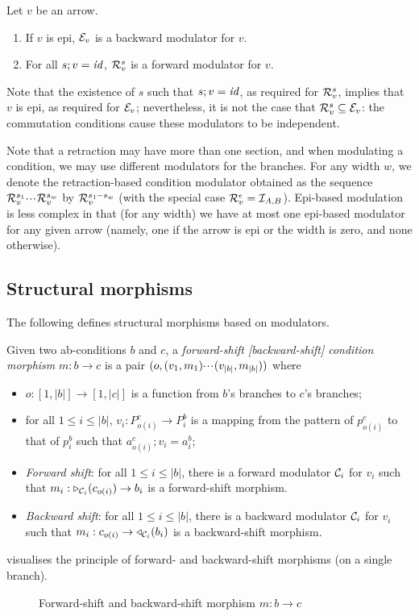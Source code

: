\begin{proposition}
Let $v$ be an arrow.
\begin{enumerate}
\item If $v$ is epi, $\mathcal{E}_v$ is a backward modulator for $v$.
\item For all $s;v=\mathit{id}$, $\mathcal{R}_v^s$ is a forward modulator for $v$.
\end{enumerate}
\end{proposition}
%
Note that the existence of $s$ such that $s;v=\mathit{id}$, as required for $\mathcal{R}_v^s$, implies that $v$ is epi, as required for $\mathcal{E}_v$; nevertheless, it is not the case that $\mathcal{R}_v^s\subseteq\mathcal{E}_v$: the commutation conditions cause these modulators to be independent.

Note that a retraction may have more than one section, and when modulating a condition, we may use different modulators for the branches. For any width $w$, we denote the retraction-based condition modulator obtained as the sequence $\mathcal{R}_v^{s_1}{\cdotp\mkern-2mu\cdotp\mkern-2mu\cdotp\mkern1mu} \mathcal{R}_v^{s_w}$ by $\mathcal{R}_v^{s_1{\cdotp\mkern-2mu\cdotp\mkern-2mu\cdotp\mkern1mu} s_w}$ (with the special case $\mathcal{R}_v^\epsilon=\mathcal{I}_{A,B}$). Epi-based modulation is less complex in that (for any width) we have at most one epi-based modulator for any given arrow (namely, one if the arrow is epi or the width is zero, and none otherwise).

\subsection{Structural morphisms}

The following defines structural morphisms based on modulators.

\begin{definition}
  Given two ab-conditions $b$ and $c$, a \emph{forward-shift [backward-shift] condition morphism} $m: b \to c$ is a pair $(o,(v_1,m_1){\cdotp\mkern-2mu\cdotp\mkern-2mu\cdotp\mkern1mu} (v_{|b|},m_{|b|}))$ where
  \begin{itemize}
  \item $o:[1,|b|]\to[1,|c|]$ is a function from $b$'s branches to $c$'s branches;
  \item for all $1\leq i\leq |b|$, $v_i:P^c_{o(i)}\to P^b_i$ is a mapping from the pattern of $p^c_{o(i)}$ to that of $p^b_i$ such that $a^c_{o(i)};v_i=a^b_i$;
  \item\emph{Forward shift}: for all $1\leq i\leq |b|$, there is a forward modulator $\mathcal{C}_i$ for $v_i$ such that $m_i:\triangleright_{\mathcal{C}_i}(c_{o(i)})\to b_i$ is a forward-shift morphism.
  \item\emph{Backward shift}: for all $1\leq i\leq |b|$, there is a backward modulator $\mathcal{C}_i$ for $v_i$ such that $m_i:c_{o(i)}\to \triangleleft_{\mathcal{C}_i}(b_i)$ is a backward-shift morphism.
  \end{itemize}
\end{definition}
%
 visualises the principle of forward- and backward-shift morphisms (on a single branch).
%
\begin{figure}
\centering

\caption{Forward-shift and backward-shift morphism $m:b\to c$}
\end{figure}

